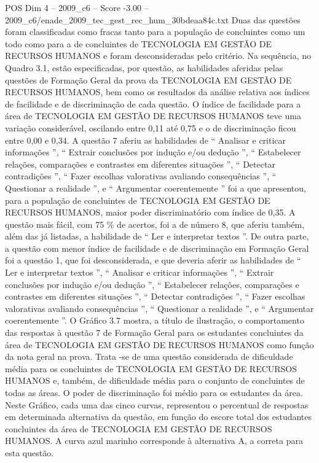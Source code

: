 \begin{textsample}{POS Dim 4 – 2009\_c6 – Score -3.00 – 2009\_c6/enade\_2009\_tec\_gest\_rec\_hum\_30bdeaa84c.txt}
Duas das questões foram classificadas como fracas tanto para a população de concluintes como um todo como para a de concluintes de TECNOLOGIA EM GESTÃO DE RECURSOS HUMANOS e foram desconsideradas pelo critério.
Na sequência, no Quadro 3.1, estão especificadas, por questão, as habilidades aferidas pelas questões de Formação Geral da prova da TECNOLOGIA EM GESTÃO DE RECURSOS HUMANOS, bem como os resultados da análise relativa aos índices de facilidade e de discriminação de cada questão.
O índice de facilidade para a área de TECNOLOGIA EM GESTÃO DE RECURSOS HUMANOS teve uma variação considerável, oscilando entre 0,11 até 0,75 e o de discriminação ficou entre 0,00 e 0,34.
A questão 7 aferiu as habilidades de “ Analisar e criticar informações ”, “ Extrair conclusões por indução e/ou dedução ”, “ Estabelecer relações, comparações e contrastes em diferentes situações ”, “ Detectar contradições ”, “ Fazer escolhas valorativas avaliando consequências ”, “ Questionar a realidade ”, e “ Argumentar coerentemente ” foi a que apresentou, para a população de concluintes de TECNOLOGIA EM GESTÃO DE RECURSOS HUMANOS, maior poder discriminatório com índice de 0,35.
A questão mais fácil, com 75 \% de acertos, foi a de número 8, que aferiu também, além das já listadas, a habilidade de “ Ler e interpretar textos ”.
De outra parte, a questão com menor índice de facilidade e de discriminação em Formação Geral foi a questão 1, que foi desconsiderada, e que deveria aferir as habilidades de “ Ler e interpretar textos ”, “ Analisar e criticar informações ”, “ Extrair conclusões por indução e/ou dedução ”, “ Estabelecer relações, comparações e contrastes em diferentes situações ”, “ Detectar contradições ”, “ Fazer escolhas valorativas avaliando consequências ”, “ Questionar a realidade ”, e “ Argumentar coerentemente ”.
O Gráfico 3.7 mostra, a título de ilustração, o comportamento das respostas à questão 7 de Formação Geral para os estudantes concluintes da área de TECNOLOGIA EM GESTÃO DE RECURSOS HUMANOS como função da nota geral na prova.
Trata -se de uma questão considerada de dificuldade média para os concluintes de TECNOLOGIA EM GESTÃO DE RECURSOS HUMANOS e, também, de dificuldade média para o conjunto de concluintes de todas as áreas.
O poder de discriminação foi médio para os estudantes da área.
Neste Gráfico, cada uma das cinco curvas, representou o percentual de respostas em determinada alternativa da questão, em função do escore total dos estudantes concluintes da área de TECNOLOGIA EM GESTÃO DE RECURSOS HUMANOS.
A curva azul marinho corresponde à alternativa A, a correta para esta questão.

\end{textsample}
